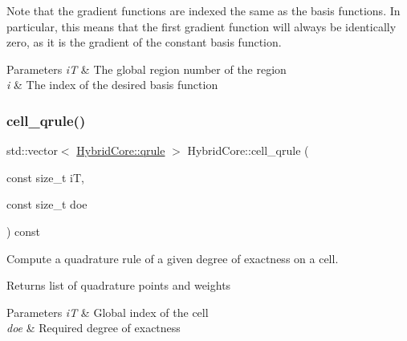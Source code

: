 Note that the gradient functions are indexed the same as the basis functions. In particular, this means that the first gradient function will always be identically zero, as it is the gradient of the constant basis function. 
\begin{DoxyParams}{Parameters}
{\em iT} & The global region number of the region \\
\hline
{\em i} & The index of the desired basis function \\
\hline
\end{DoxyParams}
\mbox{\label{classHArDCore2D_1_1HybridCore_a9ecd6ca61d4f9e3f3e3af81d8de394d0}} 
\subsubsection{\texorpdfstring{cell\+\_\+qrule()}{cell\_qrule()}}
{\footnotesize\ttfamily std\+::vector$<$ \hyperlink{structHArDCore2D_1_1HybridCore_1_1qrule}{Hybrid\+Core\+::qrule} $>$ Hybrid\+Core\+::cell\+\_\+qrule (\begin{DoxyParamCaption}\item[{const size\+\_\+t}]{iT,  }\item[{const size\+\_\+t}]{doe }\end{DoxyParamCaption}) const}



Compute a quadrature rule of a given degree of exactness on a cell. 

\begin{DoxyReturn}{Returns}
list of quadrature points and weights 
\end{DoxyReturn}

\begin{DoxyParams}{Parameters}
{\em iT} & Global index of the cell \\
\hline
{\em doe} & Required degree of exactness \\
\hline
\end{DoxyParams}
\mbox{\label{classHArDCore2D_1_1HybridCore_a6b4feaeef7739a2e30fcf6c601fcf721}} 
